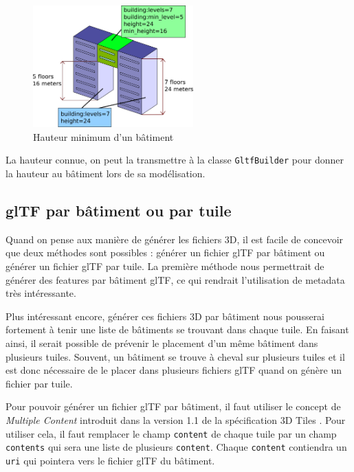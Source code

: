 \begin{figure}[H]
    \centering
    \includegraphics[width=0.55\textwidth]{assets/figures/Minlevel.svg}
    \caption{Hauteur minimum d'un bâtiment \cite{MinLevel-image}}
    \label{fig:building-Minlevel}
\end{figure}

La hauteur connue, on peut la transmettre à la classe \texttt{GltfBuilder} pour donner la hauteur au bâtiment lors de sa modélisation.

\subsection{glTF par bâtiment ou par tuile}

Quand on pense aux manière de générer les fichiers 3D, il est facile de concevoir que deux méthodes sont possibles : générer un fichier glTF par bâtiment ou générer un fichier glTF par tuile. La première méthode nous permettrait de générer des features par bâtiment glTF, ce qui rendrait l'utilisation de metadata très intéressante.

Plus intéressant encore, générer ces fichiers 3D par bâtiment nous pousserai fortement à tenir une liste de bâtiments se trouvant dans chaque tuile. En faisant ainsi, il serait possible de prévenir le placement d'un même bâtiment dans plusieurs tuiles. Souvent, un bâtiment se trouve à cheval sur plusieurs tuiles et il est donc nécessaire de le placer dans plusieurs fichiers glTF quand on génère un fichier par tuile.

Pour pouvoir générer un fichier glTF par bâtiment, il faut utiliser le concept de \textit{Multiple Content} introduit dans la version 1.1 de la spécification 3D Tiles \cite{3d-tiles-reference-card-v1_1}. Pour utiliser cela, il faut remplacer le champ \texttt{content} de chaque tuile par un champ \texttt{contents} qui sera une liste de plusieurs \texttt{content}. Chaque \texttt{content} contiendra un \texttt{uri} qui pointera vers le fichier glTF du bâtiment.

